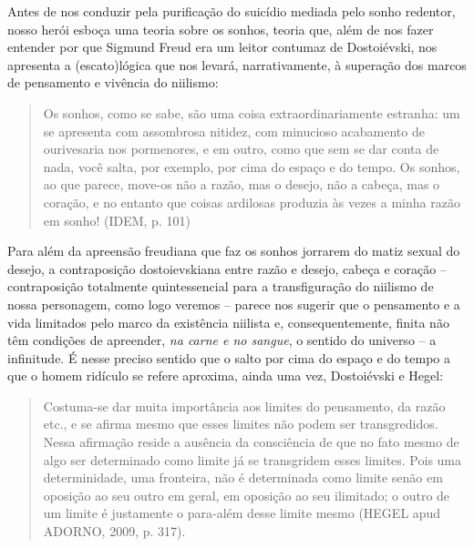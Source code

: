Antes de nos conduzir pela purificação do suicídio mediada pelo sonho
redentor, nosso herói esboça uma teoria sobre os sonhos, teoria que,
além de nos fazer entender por que Sigmund Freud era um leitor contumaz
de Dostoiévski, nos apresenta a (escato)lógica que nos levará,
narrativamente, à superação dos marcos de pensamento e vivência do
niilismo:

\begin{quote}
Os sonhos, como se sabe, são uma coisa extraordinariamente estranha: um
se apresenta com assombrosa nitidez, com minucioso acabamento de
ourivesaria nos pormenores, e em outro, como que sem se dar conta de
nada, você salta, por exemplo, por cima do espaço e do tempo. Os sonhos,
ao que parece, move-os não a razão, mas o desejo, não a cabeça, mas o
coração, e no entanto que coisas ardilosas produzia às vezes a minha
razão em sonho! (IDEM, p. 101)
\end{quote}

Para além da apreensão freudiana que faz os sonhos jorrarem do matiz
sexual do desejo, a contraposição dostoievskiana entre razão e desejo,
cabeça e coração -- contraposição totalmente quintessencial para a
transfiguração do niilismo de nossa personagem, como logo veremos --
parece nos sugerir que o pensamento e a vida limitados pelo marco da
existência niilista e, consequentemente, finita não têm condições de
apreender, \emph{na carne e no sangue}, o sentido do universo -- a
infinitude. É nesse preciso sentido que o salto por cima do espaço e do
tempo a que o homem ridículo se refere aproxima, ainda uma vez,
Dostoiévski e Hegel:

\begin{quote}
Costuma-se dar muita importância aos limites do pensamento, da razão
etc., e se afirma mesmo que esses limites não podem ser transgredidos.
Nessa afirmação reside a ausência da consciência de que no fato mesmo de
algo ser determinado como limite já se transgridem esses limites. Pois
uma determinidade, uma fronteira, não é determinada como limite senão em
oposição ao seu outro em geral, em oposição ao seu ilimitado; o outro de
um limite é justamente o para-além desse limite mesmo (HEGEL apud
ADORNO, 2009, p. 317).
\end{quote}

